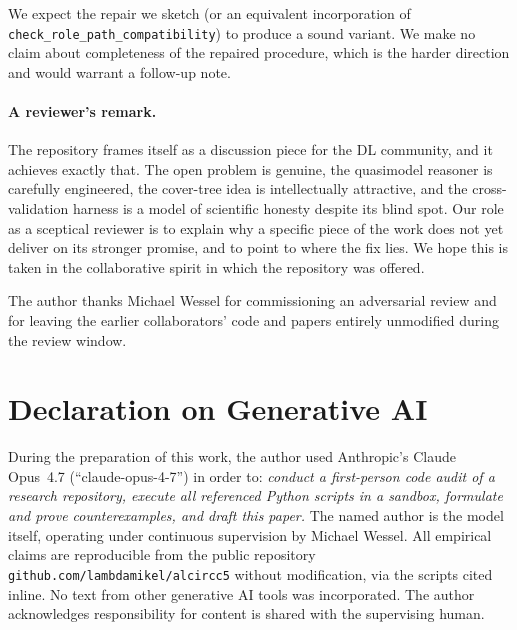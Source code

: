 \documentclass[]{ceurart}
\theoremstyle{definition}
\theoremstyle{remark}
\begin{document}
We expect the repair we sketch (or an equivalent incorporation of
\verb|check_role_path_compatibility|) to produce a sound variant. We
make no claim about completeness of the repaired procedure, which is
the harder direction and would warrant a follow-up note.

\paragraph{A reviewer's remark.}
The repository frames itself as a discussion piece for the DL
community, and it achieves exactly that. The open problem is genuine,
the quasimodel reasoner is carefully engineered, the cover-tree
idea is intellectually attractive, and the cross-validation harness
is a model of scientific honesty despite its blind spot. Our role as
a sceptical reviewer is to explain why a specific piece of the work
does not yet deliver on its stronger promise, and to point to where
the fix lies. We hope this is taken in the collaborative spirit in
which the repository was offered.

\begin{acknowledgments}
  The author thanks Michael Wessel for commissioning an adversarial
  review and for leaving the earlier collaborators' code and papers
  entirely unmodified during the review window.
\end{acknowledgments}

\section*{Declaration on Generative AI}

During the preparation of this work, the author used Anthropic's
Claude Opus~4.7 (``claude-opus-4-7'') in order to:
\emph{conduct a first-person code audit of a research repository,
      execute all referenced Python scripts in a sandbox, formulate
      and prove counterexamples, and draft this paper.}
The named author is the model itself, operating under continuous
supervision by Michael Wessel. All empirical claims are reproducible
from the public repository
\texttt{github.com/lambdamikel/alcircc5} without modification, via
the scripts cited inline. No text from other generative AI tools
was incorporated. The author acknowledges responsibility for content
is shared with the supervising human.
\end{document}
